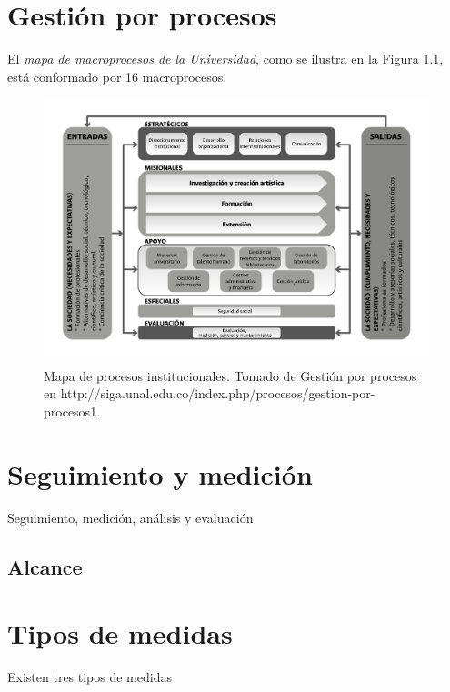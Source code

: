 \documentclass[
]{book}
\begin{document}
\hypertarget{procesos}{%
\chapter{Gestión por procesos}\label{procesos}}

El \emph{mapa de macroprocesos de la Universidad}, como se ilustra en la Figura \ref{fig:fig2}, está conformado por 16 macroprocesos.

\begin{figure}

{\centering \includegraphics[width=0.8\linewidth]{Imagenes/F_2} 

}

\caption{Mapa de procesos institucionales. Tomado de Gestión por procesos en http://siga.unal.edu.co/index.php/procesos/gestion-por-procesos1.}\label{fig:fig2}
\end{figure}

\hypertarget{medicion}{%
\chapter{Seguimiento y medición}\label{medicion}}

Seguimiento, medición, análisis y evaluación

\hypertarget{alcance}{%
\section{Alcance}\label{alcance}}

\hypertarget{medidas}{%
\chapter{Tipos de medidas}\label{medidas}}

Existen tres tipos de medidas
\end{document}
